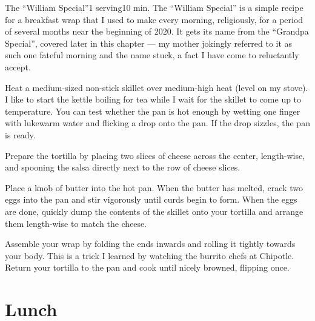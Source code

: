 \begin{recipe}{The \enquote{William Special}}{1 serving}{10 min.}
\freeform The \enquote{William Special} is a simple recipe for a breakfast wrap
that I used to make every morning, religiously, for a period of several months
near the beginning of 2020. It gets its name from the \enquote{Grandpa Special},
covered later in this chapter --- my mother jokingly referred to it as such one
fateful morning and the name stuck, a fact I have come to reluctantly accept.

\newstep Heat a medium-sized non-stick skillet over medium-high heat (level
 on my stove).  I like to start the kettle boiling for tea while
I wait for the skillet to come up to temperature. You can test whether the pan
is hot enough by wetting one finger with lukewarm water and flicking a drop onto
the pan. If the drop sizzles, the pan is ready.

Prepare the tortilla by placing two slices of cheese across the center,
length-wise, and spooning the salsa directly next to the row of cheese
slices.

Place a knob of butter into the hot pan. When the butter has melted, crack
two eggs into the pan and stir vigorously until curds begin to form. When the
eggs are done, quickly dump the contents of the skillet onto your tortilla
and arrange them length-wise to match the cheese.

\newstep Assemble your wrap by folding the ends inwards and rolling
it tightly towards your body. This is a trick I learned by watching the
burrito chefs at Chipotle\texttrademark. Return your tortilla to the pan
and cook until nicely browned, flipping once.
\end{recipe}

\section{Lunch}
\label{sec:findlay-lunch}

